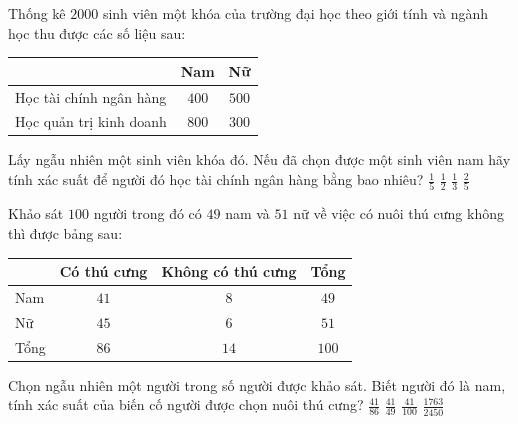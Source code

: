 \begin{ex}%
    Thống kê $2000$ sinh viên một khóa của trường đại học theo giới tính và ngành học thu được các số liệu sau:
    \begin{center}
        \begin{tabular}{|l|c|c|}
            \hline
            & Nam & Nữ \\
            \hline
            Học tài chính ngân hàng & $400$ & $500$ \\
            \hline
            Học quản trị kinh doanh & $800$ & $300$ \\
            \hline
        \end{tabular}
    \end{center}
    Lấy ngẫu nhiên một sinh viên khóa đó. Nếu đã chọn được một sinh viên nam hãy tính xác suất để người đó học tài chính ngân hàng bằng bao nhiêu?
    \choice
    {$\frac{1}{5}$}
    {$\frac{1}{2}$}
    {\True $\frac{1}{3}$}
    {$\frac{2}{5}$}
\end{ex}
\begin{ex}%
    Khảo sát $100$ người trong đó có $49$ nam và $51$ nữ về việc có nuôi thú cưng không thì được bảng sau:
    \begin{center}
        \begin{tabular}{|l|c|c|c|}
            \hline
            & Có thú cưng & Không có thú cưng & Tổng \\
            \hline
            Nam & $41$ & $8$ & $49$ \\
            \hline
            Nữ & $45$ & $6$ & $51$ \\
            \hline
            Tổng & $86$ & $14$ & $100$ \\
            \hline
        \end{tabular}
    \end{center}
    Chọn ngẫu nhiên một người trong số người được khảo sát. Biết người đó là nam, tính xác suất của biến cố người được chọn nuôi thú cưng?
    \choice
    {$\frac{41}{86}$}
    {\True $\frac{41}{49}$}
    {$\frac{41}{100}$}
    {$\frac{1763}{2450}$}
\end{ex}
